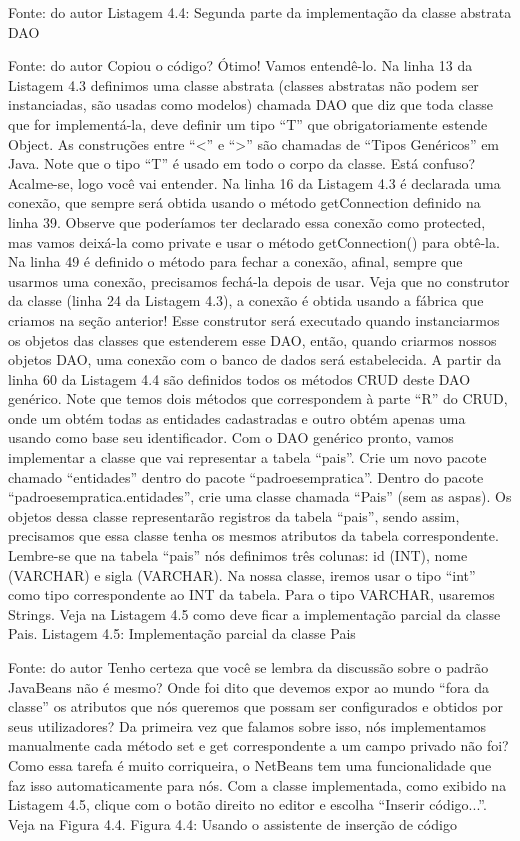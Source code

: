Fonte: do autor
Listagem 4.4: Segunda parte da implementação da classe abstrata DAO
 
Fonte: do autor
Copiou o código? Ótimo! Vamos entendê-lo. Na linha 13 da Listagem 4.3 definimos uma classe abstrata (classes abstratas não podem ser instanciadas, são usadas como modelos) chamada DAO que diz que toda classe que for implementá-la, deve definir um tipo “T” que obrigatoriamente estende Object. As construções entre “<” e “>” são chamadas de “Tipos Genéricos” em Java. Note que o tipo “T” é usado em todo o corpo da classe. Está confuso? Acalme-se, logo você vai entender.
Na linha 16 da Listagem 4.3 é declarada uma conexão, que sempre será obtida usando o método getConnection definido na linha 39. Observe que poderíamos ter declarado essa conexão como protected, mas vamos deixá-la como private e usar o método getConnection() para obtê-la. Na linha 49 é definido o método para fechar a conexão, afinal, sempre que usarmos uma conexão, precisamos fechá-la depois de usar. 
Veja que no construtor da classe (linha 24 da Listagem 4.3), a conexão é obtida usando a fábrica que criamos na seção anterior! Esse construtor será executado quando instanciarmos os objetos das classes que estenderem esse DAO, então, quando criarmos nossos objetos DAO, uma conexão com o banco de dados será estabelecida.
A partir da linha 60 da Listagem 4.4 são definidos todos os métodos CRUD deste DAO genérico. Note que temos dois métodos que correspondem à parte “R” do CRUD, onde um obtém todas as entidades cadastradas e outro obtém apenas uma usando como base seu identificador.
Com o DAO genérico pronto, vamos implementar a classe que vai representar a tabela “pais”. Crie um novo pacote chamado “entidades” dentro do pacote “padroesempratica”. Dentro do pacote “padroesempratica.entidades”, crie uma classe chamada “Pais” (sem as aspas). Os objetos dessa classe representarão registros da tabela “pais”, sendo assim, precisamos que essa classe tenha os mesmos atributos da tabela correspondente. Lembre-se que na tabela “pais” nós definimos três colunas: id (INT), nome (VARCHAR) e sigla (VARCHAR). Na nossa classe, iremos usar o tipo “int” como tipo correspondente ao INT da tabela. Para o tipo VARCHAR, usaremos Strings. Veja na Listagem 4.5 como deve ficar a implementação parcial da classe Pais.
Listagem 4.5: Implementação parcial da classe Pais
 
Fonte: do autor
 Tenho certeza que você se lembra da discussão sobre o padrão JavaBeans não é mesmo? Onde foi dito que devemos expor ao mundo “fora da classe” os atributos que nós queremos que possam ser configurados e obtidos por seus utilizadores? Da primeira vez que falamos sobre isso, nós implementamos manualmente cada método set e get correspondente a um campo privado não foi? Como essa tarefa é muito corriqueira, o NetBeans tem uma funcionalidade que faz isso automaticamente para nós. Com a classe implementada, como exibido na Listagem 4.5, clique com o botão direito no editor e escolha “Inserir código...”. Veja na Figura 4.4.
Figura 4.4: Usando o assistente de inserção de código
 
